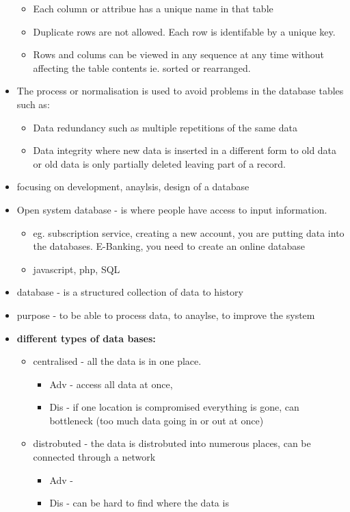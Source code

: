 \documentclass[12pt, a4, twoside]{article}
\begin{document}
\begin{center}
\begin{itemize}
\begin{itemize}
      \item Each column or attribue has a unique name in that table
      \item Duplicate rows are not allowed. Each row is identifable by a unique key.
      \item Rows and colums can be viewed in any sequence at any time without affecting the table contents ie. sorted or rearranged. 
    \end{itemize}
    \item The process or normalisation is used to avoid problems in the database tables such as:
    \begin{itemize}
      \item Data redundancy such as multiple repetitions of the same data 
      \item Data integrity where new data is inserted in a different form to old data or old data is only partially deleted leaving part of a record.
    \end{itemize}
  \end{itemize}

  \begin{itemize}
    \item focusing on development, anaylsis, design of a database 
    \item Open system database - is where people have access to input information. 
    \begin{itemize}
      \item eg. subscription service, creating a new account, you are putting data into the databases. E-Banking, you need to create an online database
      \item javascript, php, SQL
    \end{itemize}
    \item database - is a structured collection of data to history 
    \item purpose - to be able to process data, to anaylse, to improve the system
    \item \textbf{different types of data bases:}
    \begin{itemize}
      \item centralised - all the data is in one place. 
      \begin{itemize}
        \item Adv - access all data at once, 
        \item Dis - if one location is compromised everything is gone, can bottleneck (too much data going in or out at once)
      \end{itemize}
      \item distrobuted - the data is distrobuted into numerous places, can be connected through a network
      \begin{itemize}
        \item Adv - 
        \item Dis - can be hard to find where the data is
      \end{itemize}
    \end{itemize}


\end{itemize}
\end{center}
\end{document}
